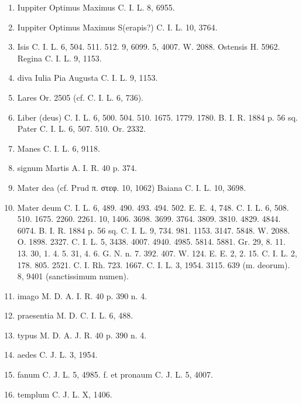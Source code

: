 \documentclass[a4paper, 11pt, oneside, polutonikogreek, german, twocolumn]{article}
\begin{document}
\begin{enumerate}
\item Iuppiter Optimus Maximus C. I. L. 8, 6955.

\item Iuppiter Optimus Maximus S(erapis?) C. I. L. 10, 3764.

\item Isis C. I. L. 6, 504. 511. 512. 9, 6099. 5, 4007. W. 2088. Ostensis H. 5962. Regina C. I. L. 9, 1153.

\item diva Iulia Pia Augusta C. I. L. 9, 1153.

\item Lares Or. 2505 (cf. C. I. L. 6, 736).

\item Liber (deus) C. I. L. 6, 500. 504. 510. 1675. 1779. 1780. B. I. R. 1884 p. 56 sq. Pater C. I. L. 6, 507. 510. Or. 2332.

\item Manes C. I. L. 6, 9118.

\item signum Martis A. I. R. 40 p. 374.

\item Mater dea (cf. Prud π. στεφ. 10, 1062) Baiana C. I. L. 10, 3698.

\item Mater deum C. I. L. 6, 489. 490. 493. 494. 502. E. E. 4, 748. C. I. L. 6, 508. 510. 1675. 2260. 2261. 10, 1406. 3698. 3699. 3764. 3809. 3810. 4829. 4844. 6074. B. I. R. 1884 p. 56 sq. C. I. L. 9, 734. 981. 1153. 3147. 5848. W. 2088. O. 1898. 2327. C. I. L. 5, 3438. 4007. 4940. 4985. 5814. 5881. Gr. 29, 8. 11. 13. 30, 1. 4. 5. 31, 4. 6. G. N. n. 7. 392. 407. W. 124. E. E. 2, 2. 15. C. I. L. 2, 178. 805. 2521. C. I. Rh. 723. 1667. C. I. L. 3, 1954. 3115. 639 (m. deorum). 8, 9401 (sanctissimum numen).

\item imago M. D. A. I. R. 40 p. 390 n. 4.

\item praesentia M. D. C. I. L. 6, 488.

\item typus M. D. A. J. R. 40 p. 390 n. 4.

\item aedes C. J. L. 3, 1954.

\item fanum C. J. L. 5, 4985. f. et pronaum C. J. L. 5, 4007.

\item templum C. J. L. X, 1406.


\end{enumerate}
\end{document}

